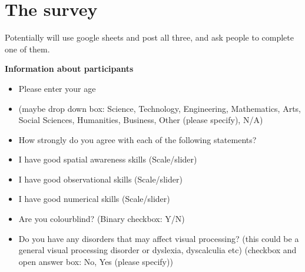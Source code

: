 
\section{The survey}

Potentially will use google sheets and post all three, and ask people to complete one of them.


\textbf{Information about participants}


\begin{itemize}
    \item Please enter your age
    
    \item (maybe drop down box: Science, Technology, Engineering, Mathematics, Arts, Social Sciences, Humanities, Business, Other (please specify), N/A)

    \item How strongly do you agree with each of the following statements?

    \item I have good spatial awareness skills (Scale/slider)
    
    \item I have good observational skills (Scale/slider)
    
    \item I have good numerical skills (Scale/slider)
    
    \item Are you colourblind? (Binary checkbox: Y/N)
    
    \item Do you have any disorders that may affect visual processing? (this could be a general visual processing disorder 
    or dyslexia, dyscalculia etc)
    (checkbox and open answer box: No, Yes (please specify))
\end{itemize}


